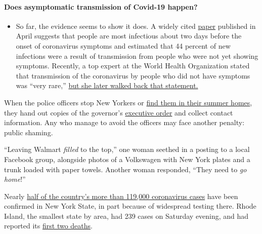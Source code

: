 \begin{itemize}
{  \paragraph{Does asymptomatic transmission of Covid-19
  happen?}\label{does-asymptomatic-transmission-of-covid-19-happen}}

  \begin{itemize}
  \tightlist
  \item
    So far, the evidence seems to show it does. A widely cited
    \href{https://www.nature.com/articles/s41591-020-0869-5}{paper}
    published in April suggests that people are most infectious about
    two days before the onset of coronavirus symptoms and estimated that
    44 percent of new infections were a result of transmission from
    people who were not yet showing symptoms. Recently, a top expert at
    the World Health Organization stated that transmission of the
    coronavirus by people who did not have symptoms was ``very rare,''
    \href{https://www.nytimes.com/2020/06/09/world/coronavirus-updates.html?action=click\&pgtype=Article\&state=default\&region=MAIN_CONTENT_3\&context=storylines_faq\#link-1f302e21}{but
    she later walked back that statement.}
  \end{itemize}
\end{itemize}

When the police officers stop New Yorkers or
\href{https://www.providencejournal.com/news/20200327/not-rsquoall-that-neighborlyrsquo-police-national-guard-out-in-westerly-looking-for-new-yorkers}{find
them in their summer homes}, they hand out copies of the governor's
\href{http://www.governor.ri.gov/documents/orders/Executive-Order-20-12.pdf}{executive
order} and collect contact information. Any who manage to avoid the
officers may face another penalty: public shaming.

``Leaving Walmart \emph{filled} to the top,'' one woman seethed in a
posting to a local Facebook group, alongside photos of a Volkswagen with
New York plates and a trunk loaded with paper towels. Another woman
responded, ``They need to \emph{go home}!''

Nearly
\href{https://www.nytimes.com/interactive/2020/us/coronavirus-us-cases.html}{half
of the country's more than 119,000 coronavirus cases} have been
confirmed in New York State, in part because of widespread testing
there. Rhode Island, the smallest state by area, had 239 cases on
Saturday evening, and had reported its
\href{https://www.providencejournal.com/news/20200328/with-first-2-ri-coronavirus-deaths-raimondo-issues-stay-at-home-order-closes-non-essential-retail}{first
two deaths}.

